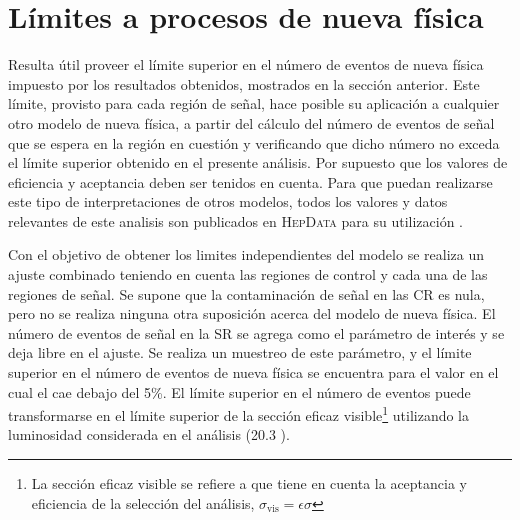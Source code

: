 

\section{Límites a procesos de nueva física} \label{sec:model_independent}



Resulta útil proveer el límite superior en el número de eventos de
nueva física impuesto por los resultados obtenidos, mostrados en la sección
anterior. Este límite, provisto para
cada región de señal, hace posible su aplicación a cualquier otro modelo de
nueva física, a partir del cálculo del número de eventos de señal que se espera
en la región en cuestión y verificando que dicho número no exceda el límite
superior obtenido en el presente análisis. Por supuesto que los valores de eficiencia y aceptancia deben ser
tenidos en cuenta.
Para que puedan realizarse este tipo de interpretaciones de otros modelos, todos
los valores y datos relevantes de este analisis son publicados en \textsc{HepData}
para su utilización \cite{hepdata}.

Con el objetivo de obtener los limites independientes del modelo se realiza un
ajuste combinado teniendo en cuenta las regiones de control y cada una de las
regiones de señal. Se supone que la contaminación de señal en las CR es nula,
pero no se realiza ninguna otra suposición acerca del modelo de nueva física. El
número de eventos de señal en la SR se agrega como el parámetro de interés y se
deja libre en el ajuste. Se realiza un muestreo de este parámetro, y el
límite superior en el número de eventos de nueva física se encuentra para el
valor en el cual el {\cls} cae debajo del 5\%. El límite superior en el número
de eventos puede transformarse en el límite superior de la sección eficaz
visible\footnote{La sección eficaz visible se refiere a que tiene en cuenta
  la aceptancia y eficiencia de la selección del análisis, $\sigma_{\text{vis}} = \epsilon\sigma$}
utilizando la luminosidad considerada en el análisis
(20.3 \ifb).

